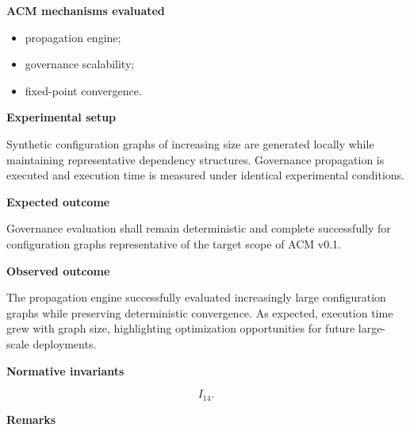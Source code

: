\documentclass[10pt]{article}
\begin{document}
\textbf{ACM mechanisms evaluated}

\begin{itemize}
    \item propagation engine;
    \item governance scalability;
    \item fixed-point convergence.
\end{itemize}

\textbf{Experimental setup}

Synthetic configuration graphs of increasing size are generated locally while
maintaining representative dependency structures. Governance propagation is
executed and execution time is measured under identical experimental
conditions.

\textbf{Expected outcome}

Governance evaluation shall remain deterministic and complete successfully for
configuration graphs representative of the target scope of ACM v0.1.

\textbf{Observed outcome}

The propagation engine successfully evaluated increasingly large configuration
graphs while preserving deterministic convergence. As expected, execution time
grew with graph size, highlighting optimization opportunities for future
large-scale deployments.

\textbf{Normative invariants}

\[
I_{14}.
\]

\textbf{Remarks}
\end{document}
